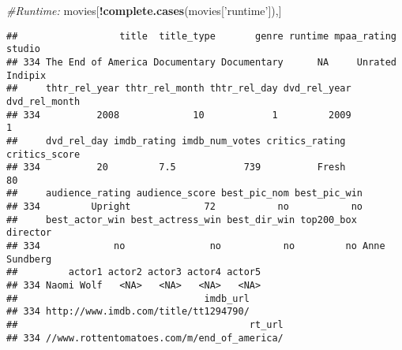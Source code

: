 \documentclass[]{article}
\newenvironment{Shaded}{\begin{snugshade}}{\end{snugshade}}
\newcommand{\KeywordTok}[1]{\textcolor[rgb]{0.13,0.29,0.53}{\textbf{#1}}}
\newcommand{\StringTok}[1]{\textcolor[rgb]{0.31,0.60,0.02}{#1}}
\newcommand{\CommentTok}[1]{\textcolor[rgb]{0.56,0.35,0.01}{\textit{#1}}}
\newcommand{\OperatorTok}[1]{\textcolor[rgb]{0.81,0.36,0.00}{\textbf{#1}}}
\newcommand{\NormalTok}[1]{#1}
\begin{document}
\begin{Shaded}
\begin{Highlighting}[]
\CommentTok{#Runtime:}
\NormalTok{movies[}\OperatorTok{!}\KeywordTok{complete.cases}\NormalTok{(movies[}\StringTok{'runtime'}\NormalTok{]),]}
\end{Highlighting}
\end{Shaded}

\begin{verbatim}
##                  title  title_type       genre runtime mpaa_rating  studio
## 334 The End of America Documentary Documentary      NA     Unrated Indipix
##     thtr_rel_year thtr_rel_month thtr_rel_day dvd_rel_year dvd_rel_month
## 334          2008             10            1         2009             1
##     dvd_rel_day imdb_rating imdb_num_votes critics_rating critics_score
## 334          20         7.5            739          Fresh            80
##     audience_rating audience_score best_pic_nom best_pic_win
## 334         Upright             72           no           no
##     best_actor_win best_actress_win best_dir_win top200_box      director
## 334             no               no           no         no Anne Sundberg
##         actor1 actor2 actor3 actor4 actor5
## 334 Naomi Wolf   <NA>   <NA>   <NA>   <NA>
##                                 imdb_url
## 334 http://www.imdb.com/title/tt1294790/
##                                         rt_url
## 334 //www.rottentomatoes.com/m/end_of_america/
\end{verbatim}
\end{document}
